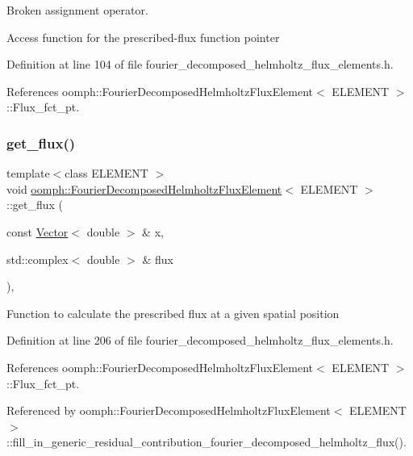 Broken assignment operator. 

Access function for the prescribed-\/flux function pointer 

Definition at line 104 of file fourier\+\_\+decomposed\+\_\+helmholtz\+\_\+flux\+\_\+elements.\+h.



References oomph\+::\+Fourier\+Decomposed\+Helmholtz\+Flux\+Element$<$ E\+L\+E\+M\+E\+N\+T $>$\+::\+Flux\+\_\+fct\+\_\+pt.

\mbox{\label{classoomph_1_1FourierDecomposedHelmholtzFluxElement_a6a0c60d41a579713fc8ffad34e34cf75}} 
\subsubsection{\texorpdfstring{get\+\_\+flux()}{get\_flux()}}
{\footnotesize\ttfamily template$<$class E\+L\+E\+M\+E\+NT $>$ \\
void \hyperlink{classoomph_1_1FourierDecomposedHelmholtzFluxElement}{oomph\+::\+Fourier\+Decomposed\+Helmholtz\+Flux\+Element}$<$ E\+L\+E\+M\+E\+NT $>$\+::get\+\_\+flux (\begin{DoxyParamCaption}\item[{const \hyperlink{classoomph_1_1Vector}{Vector}$<$ double $>$ \&}]{x,  }\item[{std\+::complex$<$ double $>$ \&}]{flux }\end{DoxyParamCaption})\hspace{0.3cm}{\ttfamily [inline]}, {\ttfamily [protected]}}

Function to calculate the prescribed flux at a given spatial position 

Definition at line 206 of file fourier\+\_\+decomposed\+\_\+helmholtz\+\_\+flux\+\_\+elements.\+h.



References oomph\+::\+Fourier\+Decomposed\+Helmholtz\+Flux\+Element$<$ E\+L\+E\+M\+E\+N\+T $>$\+::\+Flux\+\_\+fct\+\_\+pt.



Referenced by oomph\+::\+Fourier\+Decomposed\+Helmholtz\+Flux\+Element$<$ E\+L\+E\+M\+E\+N\+T $>$\+::fill\+\_\+in\+\_\+generic\+\_\+residual\+\_\+contribution\+\_\+fourier\+\_\+decomposed\+\_\+helmholtz\+\_\+flux().

